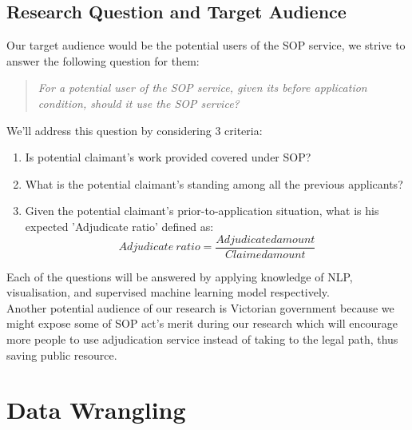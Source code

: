 \documentclass[12pt, b4paper]{article}
\begin{document}
    \subsection{Research Question and Target Audience}
    Our target audience would be the potential users of the SOP service, we strive to answer the following question for them:
    \begin{quote}
        \textit{For a potential user of the SOP service, given its before application condition, should it use the SOP service?}
    \end{quote}
    We'll address this question by considering 3 criteria:
    \begin{enumerate}
        \item Is potential claimant's work provided covered under SOP?
        \item What is the potential claimant’s standing among all the previous applicants?
        \item Given the potential claimant's prior-to-application situation, what is his expected 'Adjudicate ratio' defined as: 
          $$Adjudicate\ ratio = \frac{Adjudicated amount}{Claimed amount}$$
    \end{enumerate} 
    Each of the questions will be answered by applying knowledge of NLP, visualisation, and supervised machine learning model respectively. \\ 
    Another potential audience of our research is Victorian government because we might expose some of SOP act's merit during our research which will encourage more people to use adjudication service instead of taking to the legal path, thus saving public resource.


  \section{Data Wrangling}
\end{document}
